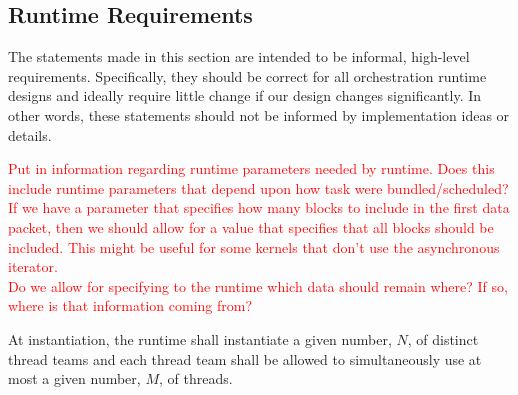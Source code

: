 \documentclass{article}
\begin{document}
%
%
%
%

\subsection{Runtime Requirements}
The statements made in this section are intended to be informal, high-level
requirements.  Specifically, they should be correct for all orchestration
runtime designs and ideally require little change if our design changes
significantly.  In other words, these statements should not be informed by
implementation ideas or details.

\textcolor{red}{Put in information regarding runtime parameters needed by
runtime.  Does this include runtime parameters that depend upon how task were
bundled/scheduled?  If we have a parameter that specifies how many blocks to
include in the first data packet, then we should allow for a value that
specifies that all blocks should be included.  This might be useful for some
kernels that don't use the asynchronous iterator.}\\

\textcolor{red}{Do we allow for specifying to the runtime which data should
remain where?  If so, where is that information coming from?}

\begin{req}
At instantiation, the runtime shall instantiate a given number, $N$, of distinct
thread teams and each thread team shall be allowed to simultaneously use
at most a given number, $M$, of threads.
\end{req}
\end{document}
